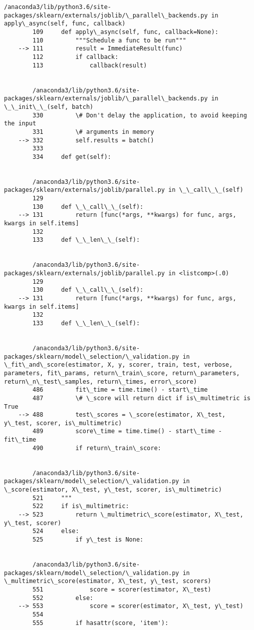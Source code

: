 \documentclass[11pt]{article}
\begin{document}
\begin{Verbatim}[commandchars=\\\{\}]
        /anaconda3/lib/python3.6/site-packages/sklearn/externals/joblib/\_parallel\_backends.py in apply\_async(self, func, callback)
        109     def apply\_async(self, func, callback=None):
        110         """Schedule a func to be run"""
    --> 111         result = ImmediateResult(func)
        112         if callback:
        113             callback(result)


        /anaconda3/lib/python3.6/site-packages/sklearn/externals/joblib/\_parallel\_backends.py in \_\_init\_\_(self, batch)
        330         \# Don't delay the application, to avoid keeping the input
        331         \# arguments in memory
    --> 332         self.results = batch()
        333 
        334     def get(self):


        /anaconda3/lib/python3.6/site-packages/sklearn/externals/joblib/parallel.py in \_\_call\_\_(self)
        129 
        130     def \_\_call\_\_(self):
    --> 131         return [func(*args, **kwargs) for func, args, kwargs in self.items]
        132 
        133     def \_\_len\_\_(self):


        /anaconda3/lib/python3.6/site-packages/sklearn/externals/joblib/parallel.py in <listcomp>(.0)
        129 
        130     def \_\_call\_\_(self):
    --> 131         return [func(*args, **kwargs) for func, args, kwargs in self.items]
        132 
        133     def \_\_len\_\_(self):


        /anaconda3/lib/python3.6/site-packages/sklearn/model\_selection/\_validation.py in \_fit\_and\_score(estimator, X, y, scorer, train, test, verbose, parameters, fit\_params, return\_train\_score, return\_parameters, return\_n\_test\_samples, return\_times, error\_score)
        486         fit\_time = time.time() - start\_time
        487         \# \_score will return dict if is\_multimetric is True
    --> 488         test\_scores = \_score(estimator, X\_test, y\_test, scorer, is\_multimetric)
        489         score\_time = time.time() - start\_time - fit\_time
        490         if return\_train\_score:


        /anaconda3/lib/python3.6/site-packages/sklearn/model\_selection/\_validation.py in \_score(estimator, X\_test, y\_test, scorer, is\_multimetric)
        521     """
        522     if is\_multimetric:
    --> 523         return \_multimetric\_score(estimator, X\_test, y\_test, scorer)
        524     else:
        525         if y\_test is None:


        /anaconda3/lib/python3.6/site-packages/sklearn/model\_selection/\_validation.py in \_multimetric\_score(estimator, X\_test, y\_test, scorers)
        551             score = scorer(estimator, X\_test)
        552         else:
    --> 553             score = scorer(estimator, X\_test, y\_test)
        554 
        555         if hasattr(score, 'item'):



\end{Verbatim}
\end{document}
